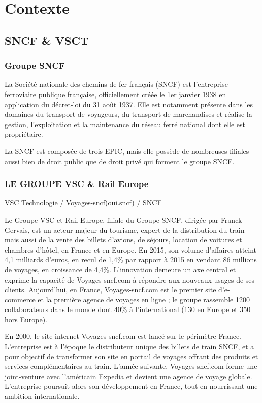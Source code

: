 \chapter{Contexte}
\label{chap:premierchapitre}

\section{SNCF \& VSCT}
\subsection{Groupe SNCF}
La Société nationale des chemins de fer français (SNCF) est l'entreprise ferroviaire publique française, officiellement créée le 1er janvier 1938 en application du décret-loi du 31 août 1937. Elle est notamment présente dans les domaines du transport de voyageurs, du transport de marchandises et réalise la gestion, l'exploitation et la maintenance du réseau ferré national dont elle est propriétaire.

La SNCF est composée de trois EPIC, mais elle possède de nombreuses filiales aussi bien de droit public que de droit privé qui forment le groupe SNCF.

\subsection{LE GROUPE VSC \& Rail Europe}
VSC Technologie / Voyages-sncf(oui.sncf) / SNCF

Le Groupe VSC et Rail Europe, filiale du Groupe SNCF, dirigée par Franck Gervais, est un acteur majeur du tourisme, expert de la distribution du train mais aussi de la vente des billets d'avions, de séjours, location de voitures et chambres d'hôtel, en France et en Europe. En 2015, son volume d’affaires atteint 4,1 milliards d’euros, en recul de 1,4\% par rapport à 2015 en vendant 86 millions de voyages, en croissance de 4,4\%. L’innovation demeure un axe central et exprime la capacité de Voyages-sncf.com à répondre aux nouveaux usages de ses clients. Aujourd’hui, en France, Voyages-sncf.com est le premier site d’e-commerce et la première agence de voyages en ligne ; le groupe rassemble 1200 collaborateurs dans le monde dont 40\% à l'international (130 en Europe et 350 hors Europe).

En 2000, le site internet Voyages-sncf.com est lancé sur le périmètre France. L’entreprise est à l’époque le distributeur unique des billets de train SNCF, et a pour objectif de transformer son site en portail de voyages offrant des produits et services complémentaires au train. L’année suivante, Voyages-sncf.com forme une joint-venture avec l’américain Expedia et devient une agence de voyage globale. L’entreprise poursuit alors son développement en France, tout en nourrissant une ambition internationale.

